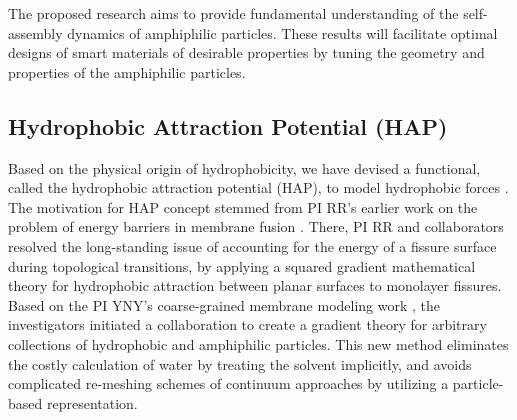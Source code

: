 %
%
The proposed research aims to provide fundamental understanding of the self-assembly dynamics of amphiphilic particles.
These results will facilitate optimal designs of smart materials of desirable properties by
tuning the geometry and properties of the amphiphilic particles. 


\subsection{Hydrophobic Attraction Potential (HAP)}
\label{sec:HAP}

Based on the physical origin of hydrophobicity,  we have devised a functional, called the hydrophobic attraction potential (HAP), to
model hydrophobic forces \cite{Fu2018_SIAM}. The motivation for HAP concept stemmed from PI RR's 
earlier work on the problem of energy barriers in membrane fusion \cite{RyKlYaCo16,Chetal16}.
There, PI RR and collaborators resolved the long-standing issue of accounting for the energy of a fissure surface
during topological transitions, by applying a squared gradient mathematical theory 
for hydrophobic attraction between planar surfaces \cite{Eriksson1989,Lum1999,Menshikov2017,Marcelja1977} to monolayer fissures.
Based on the PI YNY's coarse-grained membrane modeling work \cite{Fu2017}, 
the investigators initiated a collaboration to create a gradient theory for arbitrary collections 
of hydrophobic and amphiphilic particles. This new method 
eliminates the costly calculation of water by treating the solvent implicitly, 
and avoids complicated re-meshing schemes of continuum approaches
by utilizing a particle-based representation.

